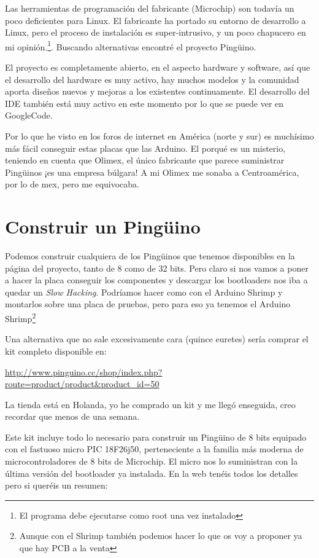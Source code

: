 \documentclass[12pt,a4paper,twoside,DIV=15]{scrartcl}
\begin{document}
Las herramientas de programación del fabricante (Microchip) son
todavía un poco deficientes para Linux. El fabricante ha portado su
entorno de desarrollo a Linux, pero el proceso de instalación es
super-intrusivo, y un poco chapucero en mi opinión.\footnote{El
  programa debe ejecutarse como root una vez instalado}. Buscando
alternativas encontré el proyecto Pingüino.

El proyecto es completamente abierto, en el aspecto hardware y
software, así que el desarrollo del hardware es muy activo, hay muchos
modelos y la comunidad aporta diseños nuevos y mejoras a los
existentes continuamente. El desarrollo del IDE también
está muy activo en este momento por lo que se puede ver en GoogleCode.

Por lo que he visto en los foros de internet en América (norte y sur)
es muchísimo más fácil conseguir estas placas que las Arduino. El
porqué es un misterio, teniendo en cuenta que Olimex, el único
fabricante que parece suministrar Pingüinos ¡es una empresa búlgara! A
mi Olimex me sonaba a Centroamérica, por lo de mex, pero me equivocaba.


\section{Construir un Pingüino}
\label{sec:pcb}

Podemos construir cualquiera de los Pingüinos que tenemos disponibles
en la página del proyecto, tanto de 8 como de 32 bits. Pero claro si
nos vamos a poner a hacer la placa conseguir los componentes y
descargar los bootloaders nos iba a quedar un \emph{Slow
  Hacking}. Podríamos hacer como con el Arduino Shrimp y montarlos
sobre una placa de pruebas, pero para eso ya tenemos el Arduino
Shrimp\footnote{Aunque con el Shrimp también podemos hacer lo que os
  voy a proponer ya que hay PCB a la venta}

Una alternativa que no sale excesivamente cara (quince euretes) sería
comprar el kit completo disponible en:

\url{http://www.pinguino.cc/shop/index.php?route=product/product&product_id=50}

La tienda está en Holanda, yo he comprado un kit y me llegó enseguida,
creo recordar que menos de una semana.

Este kit incluye todo lo necesario para construir un Pingüino de 8
bits equipado con el fastuoso micro PIC 18F26j50, perteneciente a la
familia más moderna de microcontroladores de 8 bits de Microchip. El
micro nos lo suministran con la última versión del bootloader ya
instalada. En la web tenéis todos los detalles pero si queréis un
resumen:
\end{document}

